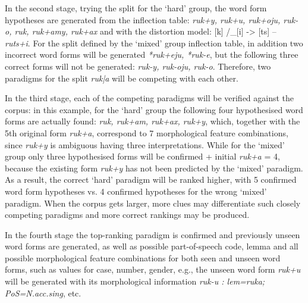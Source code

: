 \documentclass[11pt,a4paper]{article}
\begin{document}
In the second stage, trying the split for the `hard' group, the word form hypotheses are generated from the inflection table: \emph{ruk+y, ruk+u, ruk+oju, ruk-o, ruk, ruk+amy, ruk+ax} and with the distortion model: [k] /\_[i] -> [ts] -- \emph{ruts+i}. For the split defined by the `mixed' group inflection table, in addition two incorrect word forms will be generated \emph{*ruk+eju, *ruk-e}, but the following three correct forms will not be generated: \emph{ruk-y, ruk-oju, ruk-o}. Therefore, two paradigms for the split \emph{ruk|a} will be competing with each other.

In the third stage, each of the competing paradigms will be verified against the corpus: in this example, for the `hard' group the following four hypothesised word forms are actually found: \emph{ruk, ruk+am, ruk+ax, ruk+y}, which, together with the 5th original form \emph{ruk+a}, correspond to 7 morphological feature combinations, since \emph{ruk+y} is ambiguous having three interpretations. While for the `mixed' group only three hypothesised forms will be confirmed + initial \emph{ruk+a} = 4, because the existing form \emph{ruk+y} has not been predicted by the `mixed' paradigm. As a result, the correct `hard' paradigm will be ranked higher, with 5 confirmed word form hypotheses vs. 4 confirmed hypotheses for the wrong `mixed' paradigm. When the corpus gets larger, more clues may differentiate such closely competing paradigms and more correct rankings may be produced.

In the fourth stage the top-ranking paradigm is confirmed and previously unseen word forms are generated, as well as possible part-of-speech code, lemma and all possible morphological feature combinations for both seen and unseen word forms, such as values for case, number, gender, e.g., the unseen word form \emph{ruk+u} will be generated with its morphological information \emph{ruk-u : lem=ruka; PoS=N.acc.sing}, etc.
\end{document}
